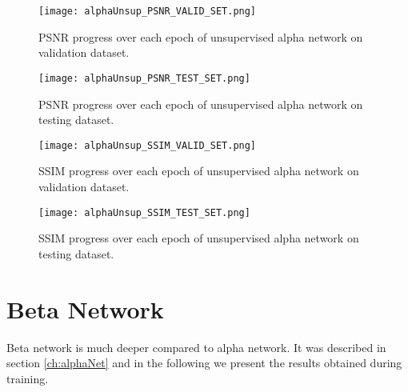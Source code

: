 \begin{figure}[tb] 
\centering 
\texttt{[image: alphaUnsup\_PSNR\_VALID\_SET.png]} 
\caption[PSNR validation progress during training of unsupervised alpha network]{PSNR progress over each epoch of unsupervised alpha network on validation dataset.}
\label{fig:alphaUnsupValidPSNR} 
\end{figure}  

\begin{figure}[tb] 
\centering 
\texttt{[image: alphaUnsup\_PSNR\_TEST\_SET.png]} 
\caption[PSNR testing progress during training of unsupervised alpha network]{PSNR progress over each epoch of unsupervised alpha network on testing dataset.}
\label{fig:alphaUnsupTestPSNR} 
\end{figure}  

\begin{figure}[tb] 
\centering 
\texttt{[image: alphaUnsup\_SSIM\_VALID\_SET.png]} 
\caption[SSIM validation progress during training of unsupervised alpha network]{SSIM progress over each epoch of unsupervised alpha network on validation dataset.}
\label{fig:alphaUnsupValidSSIM} 
\end{figure}  

\begin{figure}[tb] 
\centering 
\texttt{[image: alphaUnsup\_SSIM\_TEST\_SET.png]} 
\caption[SSIM testing progress during training of unsupervised alpha network]{SSIM progress over each epoch of unsupervised alpha network on testing dataset.}
\label{fig:alphaUnsupTestSSIM}
\end{figure}  



\FloatBarrier


\section{Beta Network}
Beta network is much deeper compared to alpha network. It was described in section \ref{ch:alphaNet} and in the following we present the results obtained during training.

